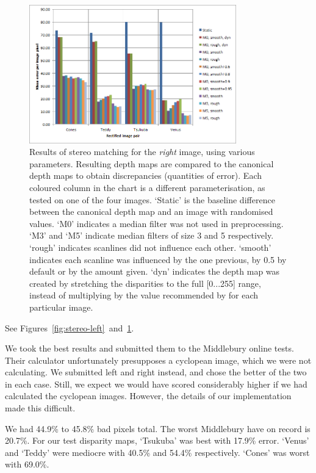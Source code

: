 \begin{figure}[h]
  \centering
  \includegraphics[width=0.8\textwidth]{Stereo-right-report}
  \caption[Results of stereo matching (left image)]{Results of stereo matching
    for the \emph{right} image, using various parameters. Resulting depth maps
    are compared to the canonical depth maps to obtain discrepancies (quantities
    of error). Each coloured column in the chart is a different
    parameterisation, as tested on one of the four images. `Static' is the
    baseline difference between the canonical depth map and an image with
    randomised values. `M0' indicates a median filter was not used in
    preprocessing. `M3' and `M5' indicate median filters of size 3 and 5
    respectively. `rough' indicates scanlines did not influence each other.
    `smooth' indicates each scanline was influenced by the one previous, by 0.5
    by default or by the amount given. `dyn' indicates the depth map was created
    by stretching the disparities to the full [0...255] range, instead of
    multiplying by the value recommended by \cite{middlebury} for each
    particular image.}
  \label{fig:stereo-right}
\end{figure}

See Figures~\ref{fig:stereo-left}~and~\ref{fig:stereo-right}.

We took the best results and submitted them to the Middlebury online tests.
\cite{stereocorrespondence, middlebury} Their calculator unfortunately
presupposes a cyclopean image, which we were not calculating. We submitted left
and right instead, and chose the better of the two in each case. Still, we
expect we would have scored considerably higher if we had calculated the
cyclopean images. However, the details of our implementation made this
difficult.

We had 44.9\% to 45.8\% bad pixels total. The worst Middlebury have on record is
20.7\%. \cite{stereocorrespondence, middlebury} For our test disparity maps,
`Tsukuba' was best with 17.9\% error. `Venus' and `Teddy' were mediocre with
40.5\% and 54.4\% respectively. `Cones' was worst with 69.0\%.

